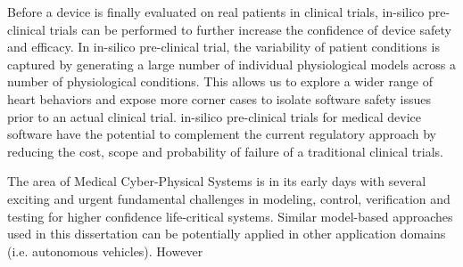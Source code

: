 Before a device is finally evaluated on real patients in clinical trials, in-silico pre-clinical trials can be performed to further increase the confidence of device safety and efficacy.
In in-silico pre-clinical trial, the variability of patient conditions is captured by generating a large number of individual physiological models across a number of physiological conditions. 
This allows us to explore a wider range of heart behaviors and expose more corner cases to isolate software safety issues prior to an actual clinical trial. 
in-silico pre-clinical trials for medical device software have the potential to complement the current regulatory approach by reducing the cost, scope and probability of failure of a traditional clinical trials. 

The area of Medical Cyber-Physical Systems is in its early days with several exciting and urgent fundamental challenges in modeling, control, verification and testing for higher confidence life-critical systems.
Similar model-based approaches used in this dissertation can be potentially applied in other application domains (i.e. autonomous vehicles).
However


